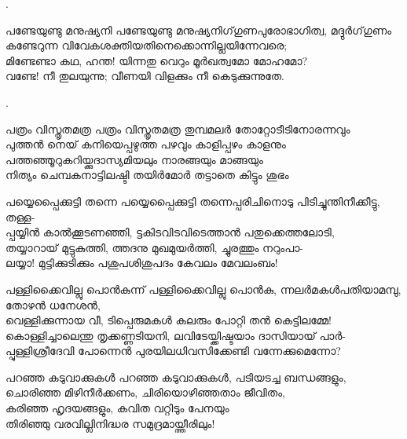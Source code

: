 \begin{enumerate}

.


\begin{slokam}{\VSv}{\KA}{പണ്ടേയുണ്ടു മനുഷ്യനി}
പണ്ടേയുണ്ടു മനുഷ്യനിഗ്‌ഗുണപുരോഭാഗിത്വ, മദ്ദുർഗ്‌ഗുണം\\
കണ്ടേറുന്ന വിവേകശക്തിയതിനെക്കൊന്നില്ലയിന്നേവരെ;\\
മിണ്ടേണ്ടാ കഥ, ഹന്ത! യിന്നതു വെറും മൂർഖത്വമോ മോഹമോ?\\
വണ്ടേ! നീ തുലയുന്നു; വീണയി വിളക്കും നീ കെടുക്കുന്നുതേ.
\end{slokam}


.



\begin{slokam}{\VSv}{\KN}{പത്രം വിസ്തൃതമത്ര}
പത്രം വിസ്തൃതമത്ര തുമ്പമലർ തോറ്റോടീടിനോരന്നവും\\
പുത്തൻ നെയ്‌ കനിയെപ്പഴുത്ത പഴവും കാളിപ്പഴം കാളനും\\
പത്തഞ്ഞൂറുകറിയ്ക്കുദാസ്യമിയലും നാരങ്ങയും മാങ്ങയും\\
നിത്യം ചെമ്പകനാട്ടിലഷ്ടി തയിർമോർ തട്ടാതെ കിട്ടും ശുഭം
\end{slokam}


\begin{slokam}{\VSr}{\VenM}{പയ്യെപ്പൈക്കുട്ടി തന്നെ}
പയ്യെപ്പൈക്കുട്ടി തന്നെപ്പരിചിനൊടു പിടിച്ചുന്തിനീക്കീട്ടു, തള്ള-\\
പ്പയ്യിൻ കാൽക്കൂടണഞ്ഞി, ട്ടകിടവിടവിടെത്താൻ പതുക്കെത്തലോടി,\\
തയ്യാറായ്‌ മുട്ടുകുത്തി, ത്തദനു മുഖമുയർത്തി, ച്ചുരത്തും നറുംപാ-\\
ലയ്യാ! മുട്ടിക്കുടിക്കും പശുപശിശുപദം കേവലം മേ\prash{}വലംബം!
\end{slokam}


\begin{slokam}{\VSr}{\VNM}{പള്ളിക്കൈവില്ലു പൊൻകുന്ന്}
പള്ളിക്കൈവില്ലു പൊൻകു, ന്നലർമകള്‍പതിയാമമ്പു, തോഴൻ ധനേശൻ,\\
വെള്ളിക്കുന്നായ വീ, ടിപ്പെരുമകള്‍ കലരും പോറ്റി തൻ കെട്ടിലമ്മേ!\\
കൊള്ളിച്ചാലെന്തു തൃക്കണ്ണടിയനി, ലവിടേയ്ക്കിഷ്ടയാം ദാസിയായ്‌ പാർ-\\
പ്പുള്ളിശ്രീദേവി പോന്നെൻ പുരയിലധിവസിക്കേണ്ടി വന്നേക്കുമെന്നോ?
\end{slokam}



\begin{slokam}{\VPv}{\UN}{പറഞ്ഞ കടുവാക്കുകൾ}
പറഞ്ഞ കടുവാക്കുകൾ, പടിയടച്ച ബന്ധങ്ങളും,\\
ചൊരിഞ്ഞ മിഴിനീർക്കണം, ചിരിയൊഴിഞ്ഞതാം ജീവിതം,\\
കരിഞ്ഞ ഹൃദയങ്ങളും, കവിത വറ്റിടും പേനയും\\
തിരിഞ്ഞു വരവില്ലിനിദ്ധര സമുദ്രമായ്ത്തീരിലും!
\end{slokam}


\end{enumerate}
